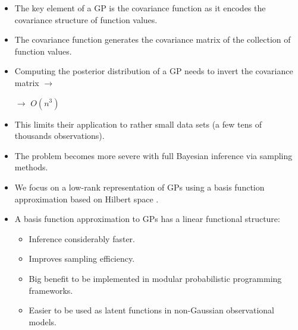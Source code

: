 \documentclass[8pt]{beamer} %
\begin{document}
\begin{frame}

\begin{itemize}\setlength\itemsep{2mm}
\item The key element of a GP is the {\color{navyblue} covariance function} as it encodes the covariance structure of function values.

\item The covariance function generates the {\color{navyblue} covariance matrix} of the collection of function values.

\item Computing the posterior distribution of a GP {\color{navyblue} needs to invert the covariance matrix} $\to$\\ 
\begin{center}
{$\to$ \color{red} $O(n^3)$}
\end{center} 

\item This {\color{navyblue} limits their application} to rather small data sets (a few tens of thousands observations).

\item The problem {\color{navyblue} becomes more severe} with full Bayesian inference via sampling methods. 

\end{itemize}
\end{frame}

\begin{frame}

\begin{itemize}\setlength\itemsep{3mm}
\item We focus on a low-rank representation of GPs using a {\color{navyblue} basis function approximation based on Hilbert space} {\color{darkgray} \citep{solin2018hilbert}}.

\item A basis function approximation to GPs has a linear functional structure:\\[2mm]
	\begin{itemize}\setlength\itemsep{1mm}
	\item Inference considerably faster.
	\item Improves sampling efficiency.
	\item Big benefit to be implemented in modular probabilistic programming frameworks. 
	\item Easier to be used as latent functions in non-Gaussian observational models. 
	\end{itemize}
\end{itemize}
\end{frame}
\end{document}
